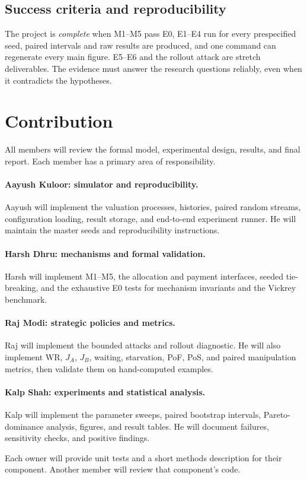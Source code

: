 \documentclass{article}
\begin{document}
\subsection{Success criteria and reproducibility}

The project is \emph{complete} when M1--M5 pass E0, E1--E4 run for every
prespecified seed, paired intervals and raw results are produced, and one
command can regenerate every main figure. E5--E6 and the rollout attack are
stretch deliverables. The evidence must answer the research questions
reliably, even when it contradicts the hypotheses.

\section{Contribution}
\label{sec:contributions}

All members will review the formal model, experimental design, results, and
final report. Each member has a primary area of responsibility.

\paragraph{Aayush Kuloor: simulator and reproducibility.}
Aayush will implement the valuation processes, histories, paired random
streams, configuration loading, result storage, and end-to-end experiment
runner. He will maintain the master seeds and reproducibility instructions.

\paragraph{Harsh Dhru: mechanisms and formal validation.}
Harsh will implement M1--M5, the allocation and payment interfaces, seeded
tie-breaking, and the exhaustive E0 tests for mechanism invariants and the
Vickrey benchmark.

\paragraph{Raj Modi: strategic policies and metrics.}
Raj will implement the bounded attacks and rollout diagnostic. He will also
implement WR, $J_A$, $J_B$, waiting, starvation, PoF, PoS, and paired
manipulation metrics, then validate them on hand-computed examples.

\paragraph{Kalp Shah: experiments and statistical analysis.}
Kalp will implement the parameter sweeps, paired bootstrap intervals,
Pareto-dominance analysis, figures, and result tables. He will document
failures, sensitivity checks, and positive findings.

Each owner will provide unit tests and a short methods description for their
component. Another member will review that component's code.



\end{document}
